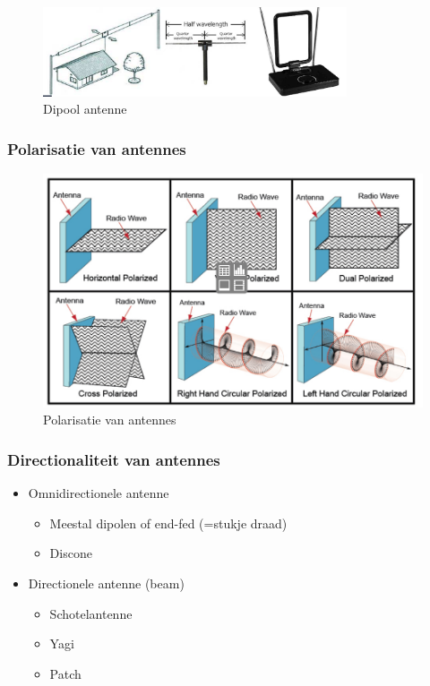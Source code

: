 \documentclass{article}
\begin{document}
\begin{figure}[H]
    \centering
    \includegraphics[width=0.8\textwidth]{Screenshot_20200309_122306.png}
    \caption{Dipool antenne}
\end{figure}

\subsubsection{Polarisatie van antennes}
\begin{figure}[H]
    \centering
    \includegraphics[width=\textwidth]{Screenshot_20200309_122403.png}
    \caption{Polarisatie van antennes}
\end{figure}

\subsubsection{Directionaliteit van antennes}
\begin{itemize}
    \item Omnidirectionele antenne
    \begin{itemize}
        \item Meestal dipolen of end-fed (=stukje draad)
        \item Discone
    \end{itemize}
    \item Directionele antenne (beam)
    \begin{itemize}
        \item Schotelantenne
        \item Yagi
        \item Patch
    \end{itemize}
\end{itemize}
\end{document}
